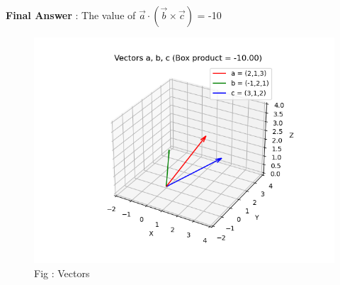 \documentclass[journal,12pt,onecolumn]{IEEEtran}
\theoremstyle{remark}
\begin{document}
\textbf{Final Answer} : The value of \(\vec{a}\cdot(\vec{b}\times\vec{c})\) = -10
 
\pagebreak

\begin{figure}[h!]
  \centering
  \includegraphics[width=0.7\columnwidth]{figs/vectors.png} 
   \caption*{Fig : Vectors}
  \label{Fig1}
\end{figure}
\end{document}
